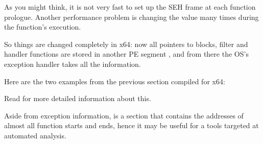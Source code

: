 
\label{SEH_win64}

As you might think, it is not very fast to set up the SEH frame at each function prologue.
Another performance problem is changing the 
 value many times during the function's execution.

So things are changed completely in x64: now all pointers to  blocks, filter and handler functions are stored
in another PE segment , 
and from there the \ac{OS}'s exception handler takes all the information.

Here are the two examples from the previous section compiled for x64:





Read \IgorSkochinsky for more detailed information about this.

Aside from exception information, 
is a section that contains the addresses of almost all function starts and ends,
hence it may be useful for a tools targeted at automated analysis.


